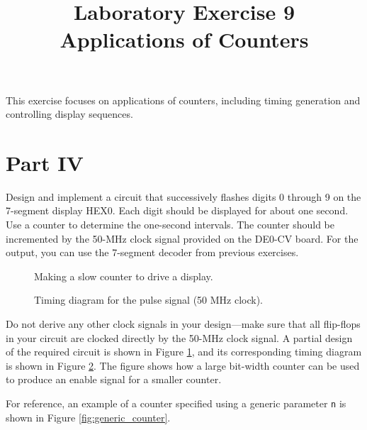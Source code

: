 \documentclass{article}
\title{Laboratory Exercise 9 \\ Applications of Counters}
\author{}
\date{}
\begin{document}
\maketitle

This exercise focuses on applications of counters, including timing generation and controlling display sequences.

\setcounter{figure}{3}

\section*{Part IV}

Design and implement a circuit that successively flashes digits 0 through 9 on the 7-segment display HEX0. Each digit should be displayed for about one second. Use a counter to determine the one-second intervals. The counter should be incremented by the 50-MHz clock signal provided on the DE0-CV board. For the output, you can use the 7-segment decoder from previous exercises.

\begin{figure}[H]
    \centering
    \resizebox{\textwidth}{!}{}
    \caption{Making a slow counter to drive a display.}
    \label{fig:slow_counter}
\end{figure}

\begin{figure}[H]
    \centering
    \resizebox{\textwidth}{!}{}
    \caption{Timing diagram for the pulse signal (50 MHz clock).}
    \label{fig:slow_counter_timing}
\end{figure}

Do not derive any other clock signals in your design—make sure that all flip-flops in your circuit are clocked directly by the 50-MHz clock signal. A partial design of the required circuit is shown in Figure \ref{fig:slow_counter}, and its corresponding timing diagram is shown in Figure \ref{fig:slow_counter_timing}. The figure shows how a large bit-width counter can be used to produce an enable signal for a smaller counter.

For reference, an example of a counter specified using a generic parameter \texttt{n} is shown in Figure \ref{fig:generic_counter}.
\end{document}
